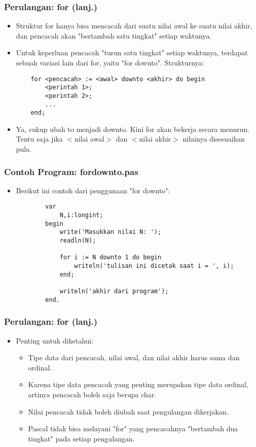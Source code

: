 \documentclass{beamer}
\begin{document}
\begin{frame}[fragile]
\frametitle{Perulangan: for (lanj.)}
\begin{itemize}
	\item Struktur for hanya bisa mencacah dari suatu nilai awal ke suatu nilai akhir, dan pencacah akan "bertambah satu tingkat" setiap waktunya.
	\item Untuk keperluan pencacah "turun satu tingkat" setiap waktunya, terdapat sebuah variasi lain dari for, yaitu "for downto". Strukturnya:
	\begin{lstlisting}
	for <pencacah> := <awal> downto <akhir> do begin
	    <perintah 1>;
	    <perintah 2>;
	    ...
	end;
	\end{lstlisting}
	\item Ya, cukup ubah \alert{to} menjadi \alert{downto}. Kini for akan bekerja secara menurun. Tentu saja jika $<$nilai awal$>$ dan $<$nilai akhir$>$ nilainya disesuaikan pula.
\end{itemize}
\end{frame}

\begin{frame}[fragile]
\frametitle{Contoh Program: fordownto.pas}
\begin{itemize}
	\item Berikut ini contoh dari penggunaan "for downto":
	\begin{lstlisting}
		var
		    N,i:longint;
		begin
		    write('Masukkan nilai N: ');
		    readln(N);
		
		    for i := N downto 1 do begin
		        writeln('tulisan ini dicetak saat i = ', i);
		    end;
		
		    writeln('akhir dari program');
		end.
	\end{lstlisting}
\end{itemize}
\end{frame}

\begin{frame}
\frametitle{Perulangan: for (lanj.)}
\begin{itemize}
	\item Penting untuk diketahui:
	\begin{itemize}
		\item Tipe data dari pencacah, nilai awal, dan nilai akhir harus sama dan \alert{ordinal}.
		\item Karena tipe data pencacah yang penting merupakan tipe data ordinal, artinya pencacah boleh saja berupa char.
		\item Nilai pencacah tidak boleh diubah saat pengulangan dikerjakan.
		\item Pascal tidak bisa melayani "for" yang pencacahnya "bertambah dua tingkat" pada setiap pengulangan.
	\end{itemize}
\end{itemize}
\end{frame}
\end{document}

